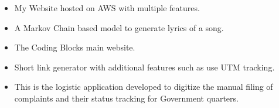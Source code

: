 
\begin{itemize}
\item My Website hosted on AWS with multiple features.
\end{itemize}


\begin{itemize}
\item A Markov Chain based model to generate lyrics of a song. 
\end{itemize}


\begin{itemize}
\item The Coding Blocks main website.
\end{itemize}

\begin{itemize}
\item Short link generator with additional features such as use UTM tracking.
\end{itemize}



\begin{itemize}
\item This is the logistic application developed to digitize the manual filing of complaints and their status tracking for Government quarters.
\end{itemize}



